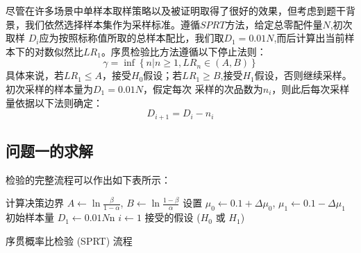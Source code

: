 \documentclass[withoutpreface,bwprint]{cumcmthesis} %
\begin{document}
尽管在许多场景中单样本取样策略以及被证明取得了很好的效果，但考虑到题干背景，我们依然选择样本集作为采样标准。遵循$SPRT$方法，给定总零配件量$N$,初次取样
$D_i$应为按照标称值所取的总样本配比，我们取$D_1=0.01N$,而后计算出当前样本下的对数似然比$LR_1$。序贯检验比方法遵循以下停止法则：
\begin{equation}
	\gamma = \inf \left\{ n | n \geq 1, LR_n \in (A, B) \right\}
\end{equation}
具体来说，若$LR_1 \le A$，接受$H_0$假设；若$LR_1 \ge B$,接受$H_1$假设，否则继续采样。初次采样的样本量为$D_1=0.01N$，假定每次
采样的次品数为$n_i$，则此后每次采样量依据以下法则确定：
\begin{equation}
	D_{i+1}=D_i-n_i
\end{equation}
\subsection{问题一的求解}
检验的完整流程可以作出如下表所示：

\begin{adjustbox}{width=16cm,height=6.5cm}
	\centering
	\begin{algorithm}[H]
		\SetAlgoLined
		计算决策边界 $A \gets \ln \frac{\beta}{1 - \alpha}$, $B \gets \ln \frac{1 - \beta}{\alpha}$\;
		设置 $\mu_0 \gets 0.1 + \Delta \mu_0$, $\mu_1 \gets 0.1 - \Delta \mu_1$\;
		初始样本量 $D_1 \gets 0.01N$n\;
		$i \gets 1$\;
		\Return 接受的假设 ($H_0$ 或 $H_1$)
		\label{alg:sprt}
		\caption{序贯概率比检验 (SPRT) 流程}
	\end{algorithm}
\end{adjustbox}
\end{document}
